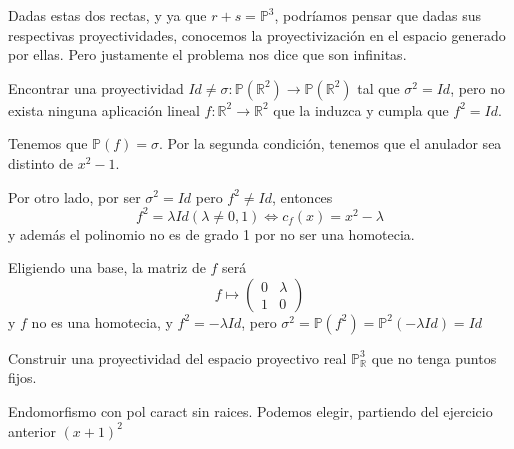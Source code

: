\begin{cor}
    Dadas estas dos rectas, y ya que $r+s = \mathbb P^3$, podr\'iamos pensar que dadas sus respectivas proyectividades, conocemos la proyectivizaci\'on en el espacio generado por ellas. Pero justamente el problema nos dice que son infinitas. 
\end{cor}
\begin{ejer}
    [7] Encontrar una proyectividad $ Id \neq \sigma: \mathbb P(\mathbb R^2 ) \to \mathbb P(\mathbb R^2 )$ tal que $\sigma^ 2 = Id$, pero no exista ninguna aplicaci\'on lineal $f : \mathbb R^2 \to \mathbb R^2$ que la induzca y cumpla que $f^2 = Id$.
\end{ejer}
\begin{sol}
    Tenemos que $\mathbb P(f) = \sigma$. Por la segunda condici\'on, tenemos que el anulador sea distinto de $x^2-1$. 

    Por otro lado, por ser $\sigma^2 = Id$ pero $f^2 \neq Id$, entonces $$f^2=\lambda Id (\lambda \neq 0,1)\iff c_f(x) = x^2 - \lambda $$
    y adem\'as el polinomio no es de grado 1 por no ser una homotecia.

    Eligiendo una base, la matriz de $f$ ser\'a
    $$f \longmapsto \begin{pmatrix}
        0 & \lambda \\ 1 & 0
    \end{pmatrix}$$
    y $f$ no es una homotecia, y $f^2 = - \lambda Id$, pero $\sigma^2 = \mathbb P(f^2) = \mathbb P^2( - \lambda Id)= Id $
\end{sol}
\begin{ejer}
    [8] Construir una proyectividad del espacio proyectivo real $\mathbb P^3_{\mathbb R}$ que no tenga puntos fijos.
\end{ejer}
\begin{sol}
    Endomorfismo con pol caract sin raices. Podemos elegir, partiendo del ejercicio anterior $(x+1)^2$
\end{sol}

